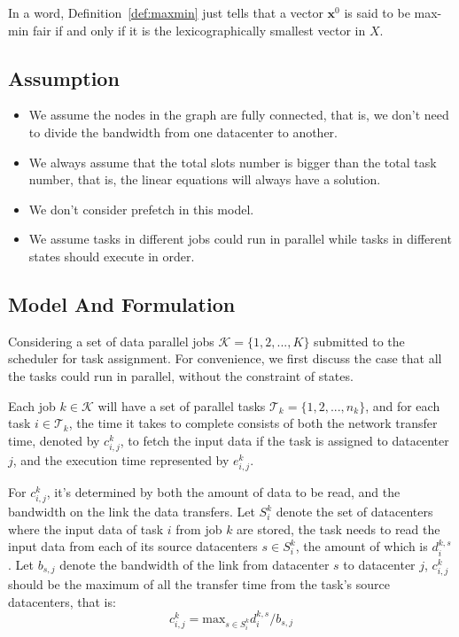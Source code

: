 \documentclass{llncs}
\begin{document}
In a word, Definition~\ref{def:maxmin} just tells that a vector $\mathbf{x}^0$ is said to be max-min fair if and only if it is the lexicographically smallest vector in $X$.

\subsection{Assumption}
\begin{itemize}
    \item We assume the nodes in the graph are fully connected, that is, we don't need to divide the bandwidth from one datacenter to another.
    \item We always assume that the total slots number is bigger than the total task number, that is, the linear equations will always have a solution.
    \item We don't consider prefetch in this model.
    \item We assume tasks in different jobs could run in parallel while tasks in different states should execute in order.
\end{itemize}

\subsection{Model And Formulation}
Considering a set of data parallel jobs $\mathcal{K} = \{1,2,...,K\}$ submitted to the scheduler for task assignment. For convenience, we first discuss the case that all the tasks could run in parallel, without the constraint of states.

Each job $k \in \mathcal{K}$ will have a set of parallel tasks $\mathcal{T}_k = \{1,2,...,n_k\}$, and for each task $i \in \mathcal{T}_k$, the time it takes to complete consists of both the network transfer time, denoted by $c_{i,j}^k$, to fetch the input data if the task is assigned to datacenter $j$, and the execution time represented by $e_{i,j}^k$. 

For $c_{i,j}^k$, it's determined by both the amount of data to be read, and the bandwidth on the link the data transfers.  Let $S_i^k$ denote the set of datacenters where the input data of task $i$ from job $k$ are stored, the task needs to read the input data from each of its source datacenters $s \in S_i^k$, the amount of which is $d_i^{k,s}$. Let $b_{s,j}$ denote the bandwidth of the link from datacenter $s$ to datacenter $j$, $c_{i,j}^k$ should be the maximum of all the transfer time from the task's source datacenters, that is:
\begin{equation*}
    c_{i,j}^k = \mbox{max}_{s \in S_i^k} d_i^{k,s}/b_{s,j}
\end{equation*}
\end{document}

